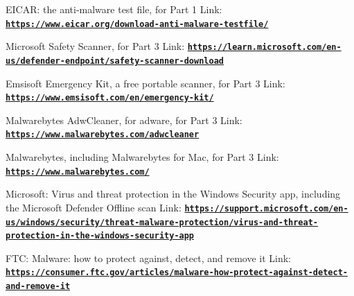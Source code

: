 \documentclass[12pt]{article}
\begin{document}
EICAR: the anti-malware test file, for Part 1
Link: \href{https://www.eicar.org/download-anti-malware-testfile/}{\textbf{\nolinkurl{https://www.eicar.org/download-anti-malware-testfile/}}}

Microsoft Safety Scanner, for Part 3
Link: \href{https://learn.microsoft.com/en-us/defender-endpoint/safety-scanner-download}{\textbf{\nolinkurl{https://learn.microsoft.com/en-us/defender-endpoint/safety-scanner-download}}}

Emsisoft Emergency Kit, a free portable scanner, for Part 3
Link: \href{https://www.emsisoft.com/en/emergency-kit/}{\textbf{\nolinkurl{https://www.emsisoft.com/en/emergency-kit/}}}

Malwarebytes AdwCleaner, for adware, for Part 3
Link: \href{https://www.malwarebytes.com/adwcleaner}{\textbf{\nolinkurl{https://www.malwarebytes.com/adwcleaner}}}

Malwarebytes, including Malwarebytes for Mac, for Part 3
Link: \href{https://www.malwarebytes.com/}{\textbf{\nolinkurl{https://www.malwarebytes.com/}}}

Microsoft: Virus and threat protection in the Windows Security app, including the Microsoft Defender Offline scan
Link: \href{https://support.microsoft.com/en-us/windows/security/threat-malware-protection/virus-and-threat-protection-in-the-windows-security-app}{\textbf{\nolinkurl{https://support.microsoft.com/en-us/windows/security/threat-malware-protection/virus-and-threat-protection-in-the-windows-security-app}}}

FTC: Malware: how to protect against, detect, and remove it
Link: \href{https://consumer.ftc.gov/articles/malware-how-protect-against-detect-and-remove-it}{\textbf{\nolinkurl{https://consumer.ftc.gov/articles/malware-how-protect-against-detect-and-remove-it}}}
\end{document}
